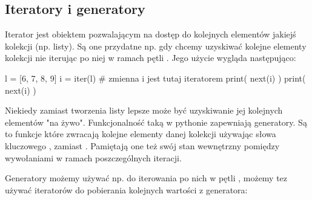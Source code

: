 % 
% 
% 
% 

\subsection{Iteratory i generatory {\Symbola 🤔}}

Iterator jest obiektem pozwalającym na dostęp do kolejnych elementów jakiejś kolekcji (np. listy).
Są one przydatne np. gdy chcemy uzyskiwać kolejne elementy kolekcji nie iterując po niej w ramach pętli .
Jego użycie wygląda następująco:

\begin{CodeFrame*}[python]{}
l = [6, 7, 8, 9]
i = iter(l)  # zmienna i jest tutaj iteratorem
print( next(i) )
print( next(i) )
\end{CodeFrame*}

Niekiedy zamiast tworzenia listy lepsze może być uzyskiwanie jej kolejnych elementów "na żywo".
Funkcjonalność taką w pythonie zapewniają generatory.
Są to funkcje które zwracają kolejne elementy danej kolekcji używając słowa kluczowego , zamiast .
Pamiętają one też swój stan wewnętrzny pomiędzy wywołaniami w ramach poszczególnych iteracji.

Generatory możemy używać np. do iterowania po nich w pętli ,
możemy tez używać iteratorów do pobierania kolejnych wartości z generatora:

